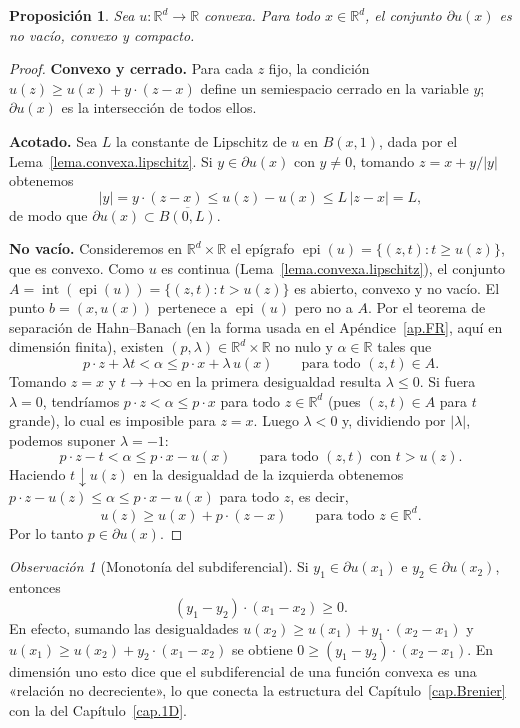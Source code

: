 \documentclass[12pt, a4paper]{amsbook}
\newcommand{\R}{{\mathbb R}}
\newtheorem{prop}[teo]{Proposición}
\theoremstyle{remark}
\newtheorem{obs}[teo]{Observación}
\theoremstyle{definition}
\numberwithin{section}{chapter}
\numberwithin{subsection}{section}
\numberwithin{equation}{section}
\numberwithin{figure}{chapter}
\begin{document}
\begin{prop}\label{prop.subdiferencial.novacio}
Sea $u\colon\R^d\to\R$ convexa. Para todo $x\in\R^d$, el conjunto
$\partial u(x)$ es no vacío, convexo y compacto.
\end{prop}

\begin{proof}
\textbf{Convexo y cerrado.} Para cada $z$ fijo, la condición
$u(z)\ge u(x)+y\cdot(z-x)$ define un semiespacio cerrado en la variable $y$;
$\partial u(x)$ es la intersección de todos ellos.

\medskip
\textbf{Acotado.} Sea $L$ la constante de Lipschitz de $u$ en $B(x,1)$, dada
por el Lema~\ref{lema.convexa.lipschitz}. Si $y\in\partial u(x)$ con $y\neq0$,
tomando $z=x+y/|y|$ obtenemos
\[
|y|=y\cdot(z-x)\le u(z)-u(x)\le L\,|z-x|=L,
\]
de modo que $\partial u(x)\subset\overline{B(0,L)}$.

\medskip
\textbf{No vacío.} Consideremos en $\R^d\times\R$ el epígrafo
$\operatorname{epi}(u)=\{(z,t):t\ge u(z)\}$, que es convexo. Como $u$ es
continua (Lema~\ref{lema.convexa.lipschitz}), el conjunto
$A=\operatorname{int}(\operatorname{epi}(u))=\{(z,t):t>u(z)\}$ es abierto,
convexo y no vacío. El punto $b=(x,u(x))$ pertenece a $\operatorname{epi}(u)$
pero no a $A$. Por el teorema de separación de Hahn--Banach (en la forma
usada en el Apéndice~\ref{ap.FR}, aquí en dimensión finita), existen
$(p,\lambda)\in\R^d\times\R$ no nulo y $\alpha\in\R$ tales que
\[
p\cdot z+\lambda t<\alpha\le p\cdot x+\lambda\,u(x)
\qquad\text{para todo }(z,t)\in A.
\]
Tomando $z=x$ y $t\to+\infty$ en la primera desigualdad resulta $\lambda\le0$.
Si fuera $\lambda=0$, tendríamos $p\cdot z<\alpha\le p\cdot x$ para todo
$z\in\R^d$ (pues $(z,t)\in A$ para $t$ grande), lo cual es imposible para
$z=x$. Luego $\lambda<0$ y, dividiendo por $|\lambda|$, podemos suponer
$\lambda=-1$:
\[
p\cdot z-t<\alpha\le p\cdot x-u(x)
\qquad\text{para todo }(z,t)\text{ con }t>u(z).
\]
Haciendo $t\downarrow u(z)$ en la desigualdad de la izquierda obtenemos
$p\cdot z-u(z)\le\alpha\le p\cdot x-u(x)$ para todo $z$, es decir,
\[
u(z)\ge u(x)+p\cdot(z-x)
\qquad\text{para todo }z\in\R^d.
\]
Por lo tanto $p\in\partial u(x)$.
\end{proof}

\begin{obs}[Monotonía del subdiferencial]\label{obs.subdiferencial.monotono}
Si $y_1\in\partial u(x_1)$ e $y_2\in\partial u(x_2)$, entonces
\[
(y_1-y_2)\cdot(x_1-x_2)\ge0.
\]
En efecto, sumando las desigualdades $u(x_2)\ge u(x_1)+y_1\cdot(x_2-x_1)$ y
$u(x_1)\ge u(x_2)+y_2\cdot(x_1-x_2)$ se obtiene
$0\ge(y_1-y_2)\cdot(x_2-x_1)$. En dimensión uno esto dice que el subdiferencial
de una función convexa es una «relación no decreciente», lo que conecta la
estructura del Capítulo~\ref{cap.Brenier} con la del Capítulo~\ref{cap.1D}.
\end{obs}
\end{document}
